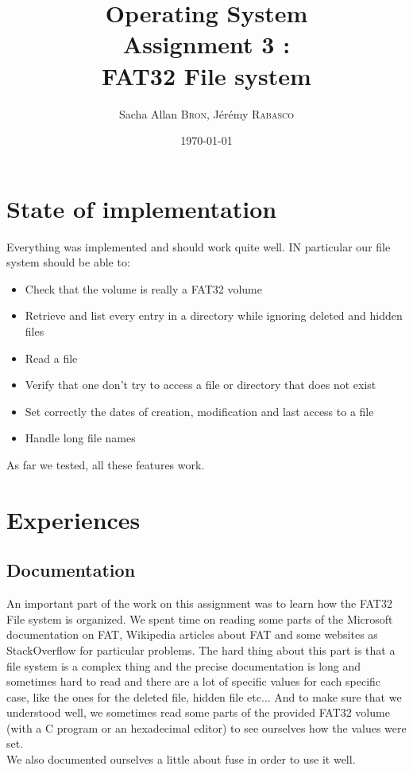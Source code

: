 \documentclass{article}
\title{Operating System\\Assignment 3 : \\ FAT32 File system} %
\author{Sacha Allan \textsc{Bron}, J\'er\'emy \textsc{Rabasco}} %
\date{\today} %
\begin{document}
\maketitle %




\section{State of implementation}
Everything was implemented and should work quite well. IN particular our file system should be able to:
\begin{itemize}
\item Check that the volume is really a FAT32 volume
\item Retrieve and list every entry in a directory while ignoring deleted and hidden files
\item Read a file
\item Verify that one don't try to access a file or directory that does not exist
\item Set correctly the dates of creation, modification and last access to a file
\item Handle long file names
\end{itemize}

As far we tested, all these features work.
\section{Experiences}

\subsection{Documentation}

An important part of the work on this assignment was to learn how the FAT32 File system is organized. We spent time on reading some parts of the Microsoft documentation on FAT, Wikipedia articles about FAT and some websites as StackOverflow for particular problems. The hard thing about this part is that a file system is a complex thing and the precise documentation is long and sometimes hard to read and there are a lot of specific values for each specific case, like the ones for the deleted file, hidden file etc... And to make sure that we understood well, we sometimes read some parts of the provided FAT32 volume (with a C program or an hexadecimal editor) to see ourselves how the values were set.\\
We also documented ourselves a little about fuse in order to use it well.
\end{document}
